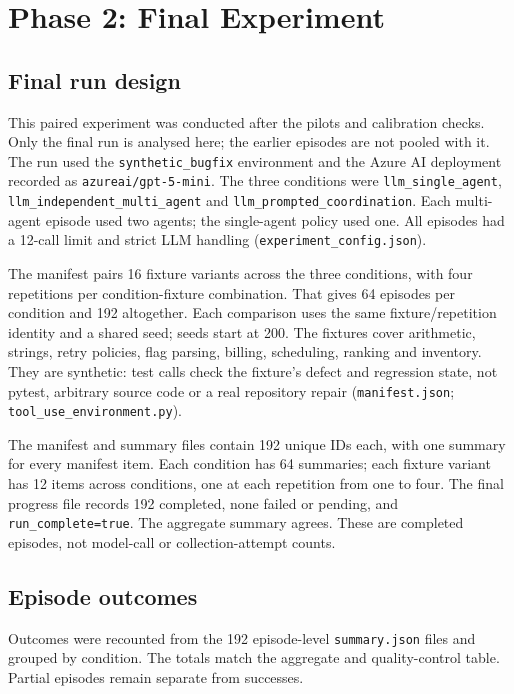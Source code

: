 \documentclass[12pt,a4paper,oneside]{report}
\begin{document}
\chapter{Phase 2: Final Experiment}
\label{chapter-09}
\thispagestyle{plain}
\section{Final run design}
This paired experiment was conducted after the pilots and calibration checks. Only the final run is analysed here; the earlier episodes are not pooled with it. The run used the \texttt{synthetic\allowbreak\_bugfix} environment and the Azure AI deployment recorded as \texttt{azureai/gpt-5-mini}. The three conditions were \texttt{llm\allowbreak\_single\allowbreak\_agent}, \texttt{llm\allowbreak\_independent\allowbreak\_multi\allowbreak\_agent} and \texttt{llm\allowbreak\_prompted\allowbreak\_coordination}. Each multi-agent episode used two agents; the single-agent policy used one. All episodes had a 12-call limit and strict LLM handling (\texttt{experiment\allowbreak\_config.json}).

The manifest pairs 16 fixture variants across the three conditions, with four repetitions per condition-fixture combination. That gives 64 episodes per condition and 192 altogether. Each comparison uses the same fixture/repetition identity and a shared seed; seeds start at 200. The fixtures cover arithmetic, strings, retry policies, flag parsing, billing, scheduling, ranking and inventory. They are synthetic: test calls check the fixture’s defect and regression state, not pytest, arbitrary source code or a real repository repair (\texttt{manifest.json}; \texttt{tool\allowbreak\_use\allowbreak\_environment.py}).

The manifest and summary files contain 192 unique IDs each, with one summary for every manifest item. Each condition has 64 summaries; each fixture variant has 12 items across conditions, one at each repetition from one to four. The final progress file records 192 completed, none failed or pending, and \texttt{run\allowbreak\_complete=true}. The aggregate summary agrees. These are completed episodes, not model-call or collection-attempt counts.

\section{Episode outcomes}
Outcomes were recounted from the 192 episode-level \texttt{summary.json} files and grouped by condition. The totals match the aggregate and quality-control table. Partial episodes remain separate from successes.
\end{document}
